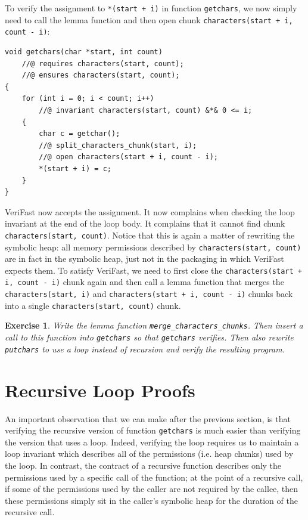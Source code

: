 \documentclass{article}
\newtheorem{exercise}{Exercise}
\begin{document}
To verify the assignment to \lstinline!*(start + i)! in function \lstinline!getchars!, we now simply need to call the lemma function and then open
chunk \lstinline!characters(start + i, count - i)!:
\begin{lstlisting}
void getchars(char *start, int count)
    //@ requires characters(start, count);
    //@ ensures characters(start, count);
{
    for (int i = 0; i < count; i++)
        //@ invariant characters(start, count) &*& 0 <= i;
    {
        char c = getchar();
        //@ split_characters_chunk(start, i);
        //@ open characters(start + i, count - i);
        *(start + i) = c;
    }
}
\end{lstlisting}

VeriFast now accepts the assignment. It now complains when checking the loop invariant at the end of the loop body. It complains that it cannot find chunk
\lstinline!characters(start, count)!. Notice that this is again a matter of rewriting the symbolic heap: all memory permissions described by
\lstinline!characters(start, count)! are in fact in the symbolic heap, just not in the packaging in which VeriFast expects them. To satisfy VeriFast,
we need to first close the \lstinline!characters(start + i, count - i)! chunk again and then call a lemma function that merges the
\lstinline!characters(start, i)! and \lstinline!characters(start + i, count - i)! chunks back into a single \lstinline!characters(start, count)! chunk.

\begin{exercise}\label{exercise:characters_loop}
Write the lemma function \lstinline!merge_characters_chunks!. Then insert a call to this function into \lstinline!getchars! so that \lstinline!getchars!
verifies. Then also rewrite \lstinline!putchars! to use a loop instead of recursion and verify the resulting program.
\end{exercise}

\section{Recursive Loop Proofs}\label{section:recursive-loop-proofs}

An important observation that we can make after the previous section, is that verifying the recursive version of function \lstinline!getchars!
is much easier than verifying the version that uses a loop. Indeed, verifying the loop requires us to maintain a loop invariant which describes all of
the permissions (i.e. heap chunks) used by the loop. In contrast, the contract of a recursive function describes only the permissions used by a
specific call of the function; at the point of a recursive call, if some of the permissions used by the caller are not required by the callee,
then these permissions simply sit in the caller's symbolic heap for the duration of the recursive call.
\end{document}
